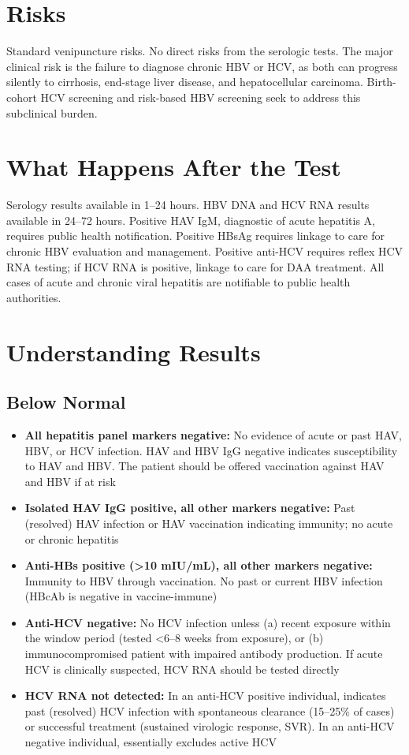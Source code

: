 \section*{Risks}
Standard venipuncture risks. No direct risks from the serologic tests. The major clinical risk is the failure to diagnose chronic HBV or HCV, as both can progress silently to cirrhosis, end-stage liver disease, and hepatocellular carcinoma. Birth-cohort HCV screening and risk-based HBV screening seek to address this subclinical burden.

\section*{What Happens After the Test}
Serology results available in 1--24 hours. HBV DNA and HCV RNA results available in 24--72 hours. Positive HAV IgM, diagnostic of acute hepatitis A, requires public health notification. Positive HBsAg requires linkage to care for chronic HBV evaluation and management. Positive anti-HCV requires reflex HCV RNA testing; if HCV RNA is positive, linkage to care for DAA treatment. All cases of acute and chronic viral hepatitis are notifiable to public health authorities.

\section*{Understanding Results}

\subsection*{Below Normal}
\begin{itemize}
  \item \textbf{All hepatitis panel markers negative:} No evidence of acute or past HAV, HBV, or HCV infection. HAV and HBV IgG negative indicates susceptibility to HAV and HBV. The patient should be offered vaccination against HAV and HBV if at risk
  \item \textbf{Isolated HAV IgG positive, all other markers negative:} Past (resolved) HAV infection or HAV vaccination indicating immunity; no acute or chronic hepatitis
  \item \textbf{Anti-HBs positive (>10 mIU/mL), all other markers negative:} Immunity to HBV through vaccination. No past or current HBV infection (HBcAb is negative in vaccine-immune)
  \item \textbf{Anti-HCV negative:} No HCV infection unless (a) recent exposure within the window period (tested <6--8 weeks from exposure), or (b) immunocompromised patient with impaired antibody production. If acute HCV is clinically suspected, HCV RNA should be tested directly
  \item \textbf{HCV RNA not detected:} In an anti-HCV positive individual, indicates past (resolved) HCV infection with spontaneous clearance (15--25\% of cases) or successful treatment (sustained virologic response, SVR). In an anti-HCV negative individual, essentially excludes active HCV
\end{itemize}

